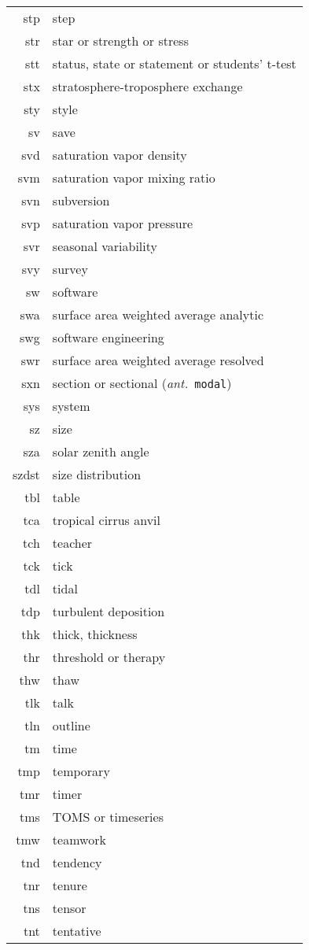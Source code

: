\documentclass[12pt,twoside]{article}
\newcommand{\ant}[1]{(\textit{ant.}~\texttt{#1})}
\begin{document}
\begin{longtable}[>{\bfseries}l]{>{\ttfamily}r l}
stp & step \\
str & star or strength or stress \\
stt & status, state or statement or students' t-test \\
stx & stratosphere-troposphere exchange \\
sty & style \\
sv & save \\
svd & saturation vapor density \\
svm & saturation vapor mixing ratio \\
svn & subversion \\
svp & saturation vapor pressure \\
svr & seasonal variability \\
svy & survey \\
sw & software \\
swa & surface area weighted average analytic \\
swg & software engineering \\
swr & surface area weighted average resolved \\
sxn & section or sectional \ant{modal} \\
sys & system \\
sz & size \\
sza & solar zenith angle \\
szdst & size distribution \\
tbl & table \\
tca & tropical cirrus anvil \\
tch & teacher \\
tck & tick \\
tdl & tidal \\
tdp & turbulent deposition \\
thk & thick, thickness \\
thr & threshold or therapy \\
thw & thaw \\
tlk & talk \\
tln & outline \\
tm & time \\
tmp & temporary \\
tmr & timer \\
tms & TOMS or timeseries \\
tmw & teamwork \\
tnd & tendency \\
tnr & tenure \\
tns & tensor \\
tnt & tentative \\

\end{longtable}
\end{document}
